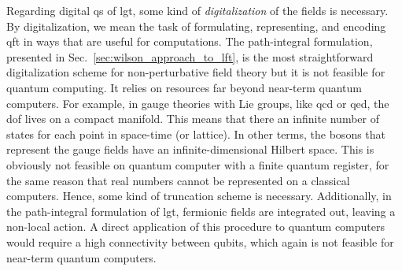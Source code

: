 Regarding digital \ac{qs} of \ac{lgt}, some kind of \emph{digitalization} of the fields is necessary.
By digitalization, we mean the task of formulating, representing, and encoding \ac{qft} in ways that are useful for computations.
The path-integral formulation, presented in Sec.~\ref{sec:wilson_approach_to_lft}, is the most straightforward digitalization scheme for non-perturbative field theory but it is not feasible for quantum computing.
It relies on resources far beyond near-term quantum computers.
For example, in gauge theories with Lie groups, like \ac{qcd} or \ac{qed}, the \ac{dof} lives on a compact manifold.
This means that there an infinite number of states for each point in space-time (or lattice).
In other terms, the bosons that represent the gauge fields have an infinite-dimensional Hilbert space.
This is obviously not feasible on quantum computer with a finite quantum register, for the same reason that real numbers cannot be represented on a classical computers.
Hence, some kind of truncation scheme is necessary.
Additionally, in the path-integral formulation of \ac{lgt}, fermionic fields are integrated out, leaving a non-local action.
A direct application of this procedure to quantum computers would require a high connectivity between qubits, which again is not feasible for near-term quantum computers.

\bigskip

